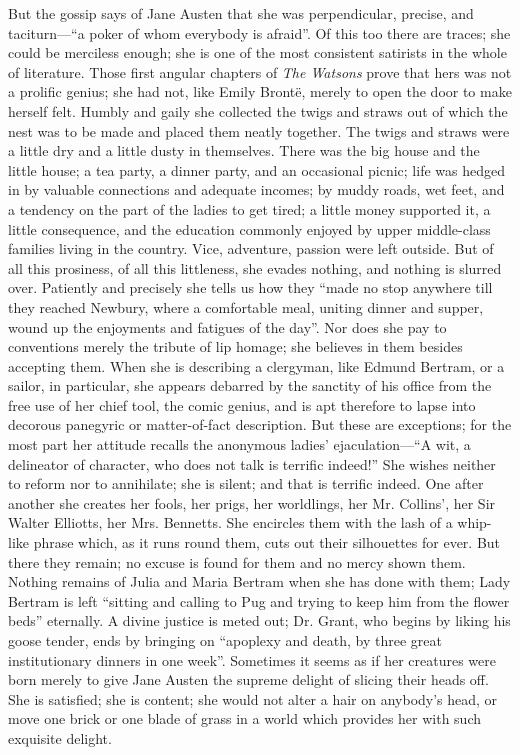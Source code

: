 But the gossip says of Jane Austen that she was perpendicular, precise, and taciturn—``a poker of whom everybody is afraid''. Of this too there are traces; she could be merciless enough; she is one of the most consistent satirists in the whole of literature. Those first angular chapters of \textit{The Watsons} prove that hers was not a prolific genius; she had not, like Emily Brontë, merely to open the door to make herself felt. Humbly and gaily she collected the twigs and straws out of which the nest was to be made and placed them neatly together. The twigs and straws were a little dry and a little dusty in themselves. There was the big house and the little house; a tea party, a dinner party, and an occasional picnic; life was hedged in by valuable connections and adequate incomes; by muddy roads, wet feet, and a tendency on the part of the ladies to get tired; a little money supported it, a little consequence, and the education commonly enjoyed by upper middle-class families living in the country. Vice, adventure, passion were left outside. But of all this prosiness, of all this littleness, she evades nothing, and nothing is slurred over. Patiently and precisely she tells us how they ``made no stop anywhere till they reached Newbury, where a comfortable meal, uniting dinner and supper, wound up the enjoyments and fatigues of the day''. Nor does she pay to conventions merely the tribute of lip homage; she believes in them besides accepting them. When she is describing a clergyman, like Edmund Bertram, or a sailor, in particular, she appears debarred by the sanctity of his office from the free use of her chief tool, the comic genius, and is apt therefore to lapse into decorous panegyric or matter-of-fact description. But these are exceptions; for the most part her attitude recalls the anonymous ladies' ejaculation—``A wit, a delineator of character, who does not talk is terrific indeed!'' She wishes neither to reform nor to annihilate; she is silent; and that is terrific indeed. One after another she creates her fools, her prigs, her worldlings, her Mr. Collins', her Sir Walter Elliotts, her Mrs. Bennetts. She encircles them with the lash of a whip-like phrase which, as it runs round them, cuts out their silhouettes for ever. But there they remain; no excuse is found for them and no mercy shown them. Nothing remains of Julia and Maria Bertram when she has done with them; Lady Bertram is left ``sitting and calling to Pug and trying to keep him from the flower beds'' eternally. A divine justice is meted out; Dr. Grant, who begins by liking his goose tender, ends by bringing on ``apoplexy and death, by three great institutionary dinners in one week''. Sometimes it seems as if her creatures were born merely to give Jane Austen the supreme delight of slicing their heads off. She is satisfied; she is content; she would not alter a hair on anybody's head, or move one brick or one blade of grass in a world which provides her with such exquisite delight.

